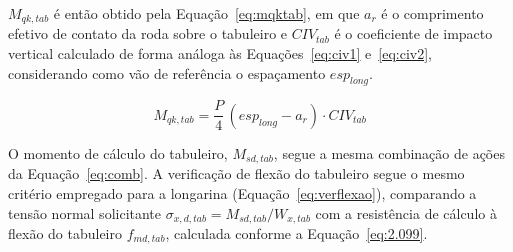 $M_{qk,tab}$ é então obtido pela Equação~\eqref{eq:mqktab}, em que $a_r$ é o comprimento efetivo de contato da roda sobre o tabuleiro e $CIV_{tab}$ é o coeficiente de impacto vertical calculado de forma análoga às Equações~\eqref{eq:civ1} e~\eqref{eq:civ2}, considerando como vão de referência o espaçamento $esp_{long}$.

\begin{equation}
M_{qk,tab} = \frac{P}{4}\,\left(esp_{long} - a_r\right)\cdot CIV_{tab}
\label{eq:mqktab}
\end{equation}

O momento de cálculo do tabuleiro, $M_{sd,tab}$, segue a mesma combinação de ações da Equação~\eqref{eq:comb}.
A verificação de flexão do tabuleiro segue o mesmo critério empregado para a longarina (Equação~\eqref{eq:verflexao}), comparando a tensão normal solicitante $\sigma_{x,d,tab} = M_{sd,tab}/W_{x,tab}$ com a resistência de cálculo à flexão do tabuleiro $f_{md,tab}$, calculada conforme a Equação~\eqref{eq:2.099}.
